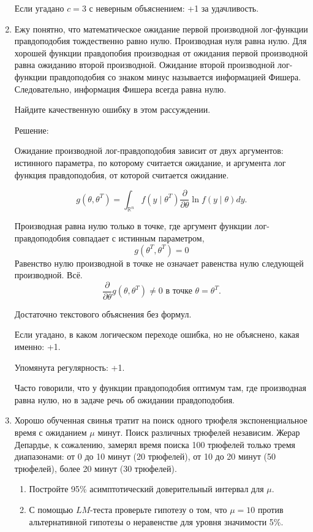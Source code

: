 \documentclass[12pt]{article}
\begin{document}
\begin{enumerate}
Если угадано $c=3$ с неверным объяснением: +1 за удачливость. 


\item Ежу понятно, что математическое ожидание первой производной лог-функции правдоподобия тождественно равно нулю.
Производная нуля равна нулю. Для хорошей функции правдопобия производная от ожидания первой производной равна ожиданию второй производной. 
Ожидание второй производной лог-функции правдоподобия со знаком минус называется информацией Фишера. 
Следовательно, информация Фишера всегда равна нулю. 

Найдите качественную ошибку в этом рассуждении. 


Решение:

Ожидание производной лог-правдоподобия зависит от двух аргументов:
истинного параметра, по которому считается ожидание, и аргумента лог функция правдоподобия, от которой считается ожидание. 

\[
g(\theta, \theta^{T}) = \int_{\mathbb{R}^n} f(y \mid \theta^T) \frac{\partial }{\partial \theta}\ln f(y \mid \theta) dy.
\]

Производная равна нулю только в точке, где аргумент функции лог-правдоподобия совпадает с истинным параметром, 
\[
g(\theta^T, \theta^T) = 0    
\]
Равенство нулю производной в точке не означает равенства нулю следующей производной. Всё.
\[
\frac{\partial}{\partial \theta} g(\theta, \theta^{T}) \neq 0 \text{ в точке } \theta = \theta^T.   
\]

Достаточно текстового объяснения без формул. 

Если угадано, в каком логическом переходе ошибка, но не объяснено, какая именно: +1. 

Упомянута регулярность: +1.

Часто говорили, что у функции правдоподобия оптимум там, где производная равна нулю, но в задаче речь об ожидании правдоподобия. 


\item Хорошо обученная свинья тратит на поиск одного трюфеля экспоненциальное время с ожиданием $\mu$ минут. 
Поиск различных трюфелей независим. 
Жерар Депардье, к сожалению, замерял время поиска 100 трюфелей только тремя диапазонами: 
от 0 до 10 минут (20 трюфелей), от 10 до 20 минут (50 трюфелей), более 20 минут (30 трюфелей). 

\begin{enumerate}
    \item Постройте 95\% асимптотический доверительный интервал для $\mu$. 
    \item С помощью $LM$-теста проверьте гипотезу о том, что $\mu = 10$ против альтернативной 
    гипотезы о неравенстве для уровня значимости 5\%.
\end{enumerate}


\end{enumerate}
\end{document}
